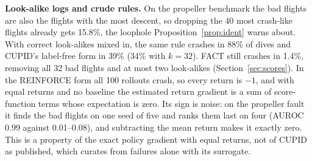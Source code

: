 \documentclass[preprint,12pt]{elsarticle}
\newcommand{\method}{FACT}
\begin{document}
\textbf{Look-alike logs and crude rules.} On the propeller benchmark the bad flights are also the flights with the most descent, so dropping the 40 most crash-like flights already gets 15.8\%, the loophole Proposition~\ref{prop:ident} warns about. With correct look-alikes mixed in, the same rule crashes in 88\% of dives and CUPID's label-free form in 39\% (34\% with $k=32$). \method{} still crashes in 1.4\%, removing all 32 bad flights and at most two look-alikes (Section~\ref{sec:scores}). In the REINFORCE form all 100 rollouts crash, so every return is $-1$, and with equal returns and no baseline the estimated return gradient is a sum of score-function terms whose expectation is zero. Its sign is noise: on the propeller fault it finds the bad flights on one seed of five and ranks them last on four (AUROC 0.99 against 0.01--0.08), and subtracting the mean return makes it exactly zero. This is a property of the exact policy gradient with equal returns, not of CUPID as published, which curates from failures alone with its surrogate.
\end{document}
